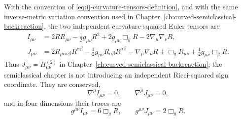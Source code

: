\begin{proposition}
\label{prop:curvature-squared-euler-tensors-point-splitting}
With the convention of
\eqref{eq:ij-curvature-tensors-definition}, and with the same inverse-metric
variation convention used in
Chapter~\ref{ch:curved-semiclassical-backreaction}, the
two independent curvature-squared Euler tensors are
\begin{equation}
\begin{aligned}
  I_{\mu\nu}
  &=
  2RR_{\mu\nu}
  -\frac12g_{\mu\nu}R^2
  +2g_{\mu\nu}\Box_gR
  -2\nabla_\mu\nabla_\nu R,\\
  J_{\mu\nu}
  &=
  2R_{\mu\alpha\nu\beta}R^{\alpha\beta}
  -\frac12g_{\mu\nu}R_{\alpha\beta}R^{\alpha\beta}
  -\nabla_\mu\nabla_\nu R
  +\Box_gR_{\mu\nu}
  +\frac12g_{\mu\nu}\Box_gR .
\end{aligned}
  \label{eq:curvature-squared-euler-tensor-formulas}
\end{equation}
Thus \(J_{\mu\nu}=H^{(2)}_{\mu\nu}\) in
Chapter~\ref{ch:curved-semiclassical-backreaction};
the semiclassical chapter is not introducing an independent Ricci-squared sign
coordinate.
They are conserved,
\begin{equation}
  \nabla^\mu I_{\mu\nu}=0,\qquad
  \nabla^\mu J_{\mu\nu}=0,
  \label{eq:curvature-squared-euler-tensor-conservation}
\end{equation}
and in four dimensions their traces are
\begin{equation}
  g^{\mu\nu}I_{\mu\nu}=6\Box_gR,\qquad
  g^{\mu\nu}J_{\mu\nu}=2\Box_gR .
  \label{eq:curvature-squared-euler-tensor-traces}
\end{equation}
\end{proposition}

